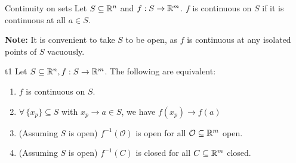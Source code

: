 \documentclass[../Analysis-3.tex]{subfiles}
\begin{document}
\begin{Def}{Continuity on sets}{}
  Let $ S \subseteq \mathbb{R}^n $ and $ f: S \to \mathbb{R}^m $. $ f $ is continuous on $ S $ if it is continuous at all $ a \in S $.
\end{Def}
\textbf{Note:} It is convenient to take $ S $ to be open, as $ f $ is continuous at any isolated points of $ S $ vacuously.
\pagebreak

\begin{Thm}{}{t1}
  Let $ S \subseteq \mathbb{R}^n, f: S \to \mathbb{R}^m $. The following are equivalent:
  \begin{enumerate}[label = (\arabic*)]
    \item $ f $ is continuous on $ S $.
    \item $ \forall \, \{x_p\} \subseteq S $ with $ x_p \longrightarrow a \in S $, we have $ f(x_p) \longrightarrow f(a) $
    \item (Assuming $ S $ is open) $ f^{-1}(\mathcal O) $ is open for all $ \mathcal O \subseteq \mathbb{R}^m $ open.
    \item (Assuming $ S $ is open) $ f^{-1}(C) $ is closed for all $ C \subseteq \mathbb{R}^m $ closed.
  \end{enumerate}
\end{Thm}
\end{document}
